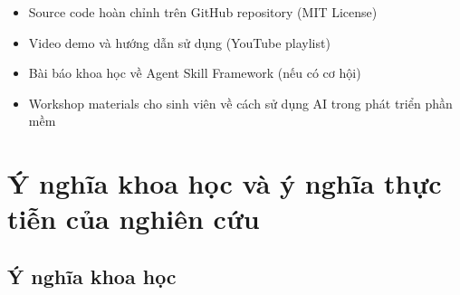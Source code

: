 \documentclass[13pt,a4paper,oneside]{extreport}
\numberwithin{equation}{chapter}
\numberwithin{figure}{chapter}
\numberwithin{table}{chapter}
\begin{document}
\begin{itemize}
    \item Source code hoàn chỉnh trên GitHub repository (MIT License)
    \item Video demo và hướng dẫn sử dụng (YouTube playlist)
    \item Bài báo khoa học về Agent Skill Framework (nếu có cơ hội)
    \item Workshop materials cho sinh viên về cách sử dụng AI trong phát triển phần mềm
\end{itemize}

\section*{Ý nghĩa khoa học và ý nghĩa thực tiễn của nghiên cứu}

\subsection*{Ý nghĩa khoa học}
\end{document}
